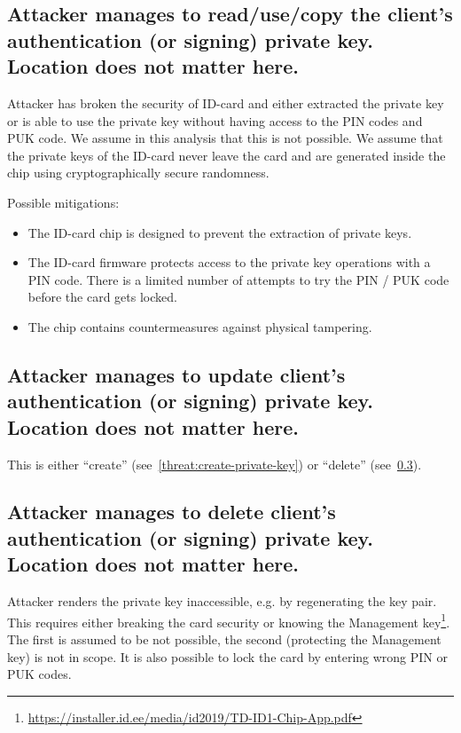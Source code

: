 \subsection{Attacker manages to read/use/copy the client's authentication (or signing) private key. Location does not matter here.}\label{threat:read-private-key}
Attacker has broken the security of ID-card and either extracted the private key or is able to use the private key without having access to the PIN codes and PUK code. We assume in this analysis that this is not possible. We assume that the private keys of the ID-card never leave the card and are generated inside the chip using cryptographically secure randomness.

Possible mitigations:
\begin{itemize}
\item The ID-card chip is designed to prevent the extraction of private keys.
\item The ID-card firmware protects access to the private key operations with a PIN code. There is a limited number of attempts to try the PIN / PUK code before the card gets locked. 
\item The chip contains countermeasures against physical tampering.
\end{itemize}


\subsection{Attacker manages to update client's authentication (or signing) private key. Location does not matter here.}\label{threat:update-private-key}
This is either ``create'' (see~\ref{threat:create-private-key}) or ``delete'' (see~\ref{threat:delete-private-key}).


\subsection{Attacker manages to delete client's authentication (or signing) private key. Location does not matter here.}\label{threat:delete-private-key}
Attacker renders the private key inaccessible, e.g. by regenerating the key pair. This requires either breaking the card security or knowing the Management key\footnote{\url{https://installer.id.ee/media/id2019/TD-ID1-Chip-App.pdf}}. The first is assumed to be not possible, the second (protecting the Management key) is not in scope. It is also possible to lock the card by entering wrong PIN or PUK codes. 

